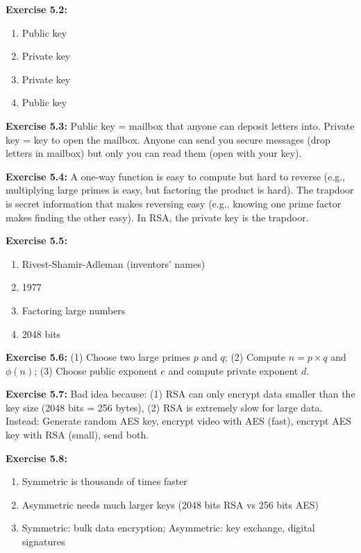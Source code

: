 \documentclass[11pt,a4paper]{report}
\begin{document}
\textbf{Exercise 5.2:}
\begin{enumerate}[label=\alph*)]
    \item Public key
    \item Private key
    \item Private key
    \item Public key
\end{enumerate}

\textbf{Exercise 5.3:}
Public key = mailbox that anyone can deposit letters into. Private key = key to open the mailbox. Anyone can send you secure messages (drop letters in mailbox) but only you can read them (open with your key).

\textbf{Exercise 5.4:}
A one-way function is easy to compute but hard to reverse (e.g., multiplying large primes is easy, but factoring the product is hard). The trapdoor is secret information that makes reversing easy (e.g., knowing one prime factor makes finding the other easy). In RSA, the private key is the trapdoor.

\textbf{Exercise 5.5:}
\begin{enumerate}[label=\alph*)]
    \item Rivest-Shamir-Adleman (inventors' names)
    \item 1977
    \item Factoring large numbers
    \item 2048 bits
\end{enumerate}

\textbf{Exercise 5.6:}
(1) Choose two large primes $p$ and $q$; (2) Compute $n = p \times q$ and $\phi(n)$; (3) Choose public exponent $e$ and compute private exponent $d$.

\textbf{Exercise 5.7:}
Bad idea because: (1) RSA can only encrypt data smaller than the key size (2048 bits = 256 bytes), (2) RSA is extremely slow for large data. Instead: Generate random AES key, encrypt video with AES (fast), encrypt AES key with RSA (small), send both.

\textbf{Exercise 5.8:}
\begin{enumerate}[label=\alph*)]
    \item Symmetric is thousands of times faster
    \item Asymmetric needs much larger keys (2048 bits RSA vs 256 bits AES)
    \item Symmetric: bulk data encryption; Asymmetric: key exchange, digital signatures
\end{enumerate}
\end{document}
